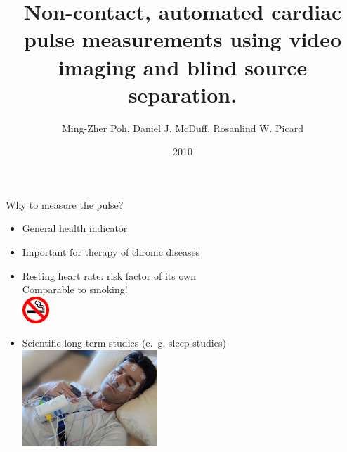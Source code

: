 \documentclass{beamer}
\title{Non-contact, automated cardiac pulse measurements using video imaging and blind source separation.}
\author{Ming-Zher Poh, Daniel J. McDuff, Rosanlind W. Picard}
\date{2010}
\begin{document}
\newcommand{\mytitle}[1]{{\Large{\underline{#1}}}}
\newcommand{\positiveaspect}{\textcolor{green}{$\oplus$}}
\newcommand{\negativeaspect}{\textcolor{red}{$\ominus$}}

\frame{\titlepage}

\begin{frame}{Why to measure the pulse?}
\begin{itemize}
	\item General health indicator \pause
	\item Important for therapy of chronic diseases \pause
	\item Resting heart rate: risk factor of its own\\ \pause
		Comparable to smoking!\\
		\includegraphics[width=1cm]{No_Smoking} \pause
	\item Scientific long term studies (e.~g. sleep studies)\\
		\includegraphics[width=0.4\textwidth]{Sleep-lab-facilities.jpg}
\end{itemize}
\end{frame}
\end{document}
